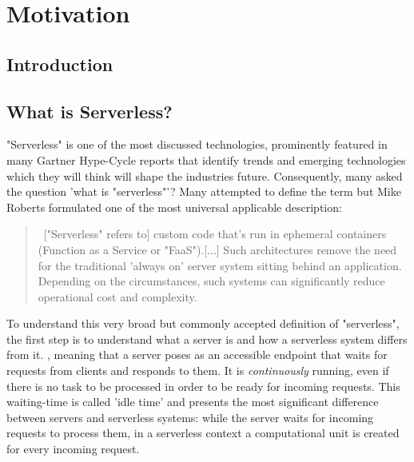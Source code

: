 \chapter{Motivation}


\section{Introduction}


\section{What is Serverless?}

"Serverless" is one of the most discussed technologies, prominently featured in many Gartner Hype-Cycle reports that identify trends and emerging technologies which they will think will shape the industries future. 
\autocite{Smith2017Hype2017}
\autocite{Weiss2017Hype2017}
\autocite{Natis2017Hype2017}
\autocite{Walker2017Hype2017}
\autocite{DawsonPhilip2017Hype2017}
Consequently, many asked the question 'what is "serverless"'? Many attempted to define the term but Mike Roberts formulated one of the most universal applicable description:  

\blockquote{\guillemotleft \ ["Serverless" refers to] custom code that's run in ephemeral containers (Function as a Service or "FaaS").[...] Such architectures remove the need for the traditional 'always on' server system sitting behind an application. Depending on the circumstances, such systems can significantly reduce operational cost and complexity. \guillemotright\autocite{Roberts2016ServerlessArchitectures}}

To understand this very broad but commonly accepted definition of "serverless", the first step is to understand what a server is and how a serverless system differs from it. \autocite{TheServer}, meaning that a server poses as an accessible endpoint that waits for requests from clients and responds to them. It is \textit{continuously} running, even if there is no task to be processed in order to be ready for incoming requests. This waiting-time is called 'idle time' and presents the most significant difference between servers and serverless systems: while the server waits for incoming requests to process them, in a serverless context a computational unit is created for every incoming request.

